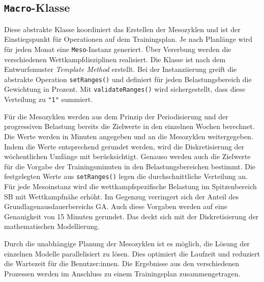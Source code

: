 \subsection{\texttt{Macro}-Klasse}
Diese abstrakte Klasse koordiniert das Erstellen der Mesozyklen und ist der Einstiegspunkt für Operationen auf dem Trainingsplan. Je nach Planlänge wird für jeden Monat eine \texttt{Meso}-Instanz generiert. Über Vererbung werden die verschiedenen Wettkampfdisziplinen realisiert. Die Klasse ist nach dem Entwurfsmuster \textit{Template Method} erstellt. Bei der Instanziierung greift die abstrakte Operation \texttt{setRanges()} und definiert für jeden Belastungsbereich die Gewichtung in Prozent. Mit \texttt{validateRanges()} wird sichergestellt, dass diese Verteilung zu \texttt{"1"} summiert.\par
Für die Mesozyklen werden aus dem Prinzip der Periodisierung und der progressiven Belastung bereits die Zielwerte in den einzelnen Wochen berechnet. Die Werte werden in Minuten angegeben und an die Mesozyklen weitergegeben. Indem die Werte entsprechend gerundet werden, wird die Diskretisierung der wöchentlichen Umfänge mit berücksichtigt.\newline
Genauso werden auch die Zielwerte für die Vorgabe der Trainingsminuten in den Belastungsbereichen bestimmt. Die festgelegten Werte aus \texttt{setRanges()} legen die durchschnittliche Verteilung an. Für jede Mesoinstanz wird die wettkampfspezifische Belastung im Spitzenbereich SB mit Wettkampfnähe erhöht. Im Gegenzug verringert sich der Anteil des Grundlagenausdauerbereichs GA. Auch diese Vorgaben werden auf eine Genauigkeit von 15 Minuten gerundet. Das deckt sich mit der Diskretisierung der mathematischen Modellierung. \par
Durch die unabhängige Planung der Mesozyklen ist es möglich, die Lösung der einzelnen Modelle parallelisiert zu lösen. Dies optimiert die Laufzeit und reduziert die Wartezeit für die Benutzer:innen. Die Ergebnisse aus den verschiedenen Prozessen werden im Anschluss zu einem Trainingsplan zusammengetragen. 

